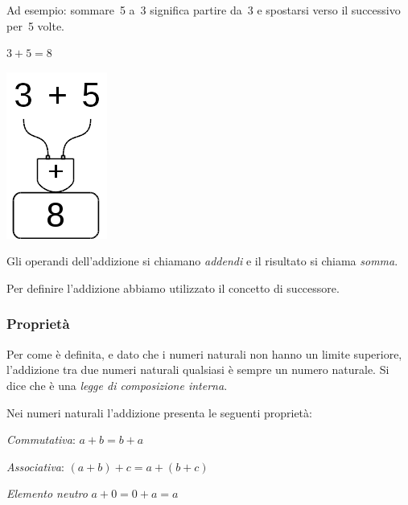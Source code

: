 Ad esempio: sommare~5 a~3 significa partire da~3 e spostarsi verso il 
successivo per~5 volte.

\begin{minipage}{0.80\textwidth}
 \centering
 \(3+5=8\)

 
\end{minipage}%
\begin{minipage}{0.15\textwidth}
 \centering
\begin{inaccessibleblock}
 \includegraphics[scale=0.35]{img/op_add.png}
\end{inaccessibleblock}
\end{minipage}%

Gli operandi dell'addizione si chiamano \emph{addendi} e il risultato si 
chiama \emph{somma}.

\osservazione Per definire l'addizione abbiamo utilizzato il concetto di 
successore.

\subsubsection{Proprietà}

Per come è definita, e dato che i numeri naturali non hanno un limite 
superiore, l'addizione tra due numeri  naturali qualsiasi è sempre un numero
naturale. Si dice che è una \emph{legge di composizione interna}. 

Nei numeri naturali l'addizione presenta le seguenti proprietà:

\begin{itemize*}
 \item \emph{Commutativa}: \(a + b = b + a\)
 \item \emph{Associativa}: \((a + b) + c = a + (b + c)\)
 \item \emph{Elemento neutro} \(a + 0 = 0 + a = a\)
\end{itemize*}

